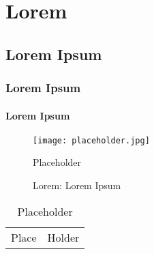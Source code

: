 \documentclass[../thesis.tex]{subfiles}
\begin{document}
\chapter{Lorem}\label{chap:lorem}


\lipsum[1-1] \citep{suprapti2017}

\section{Lorem Ipsum}

\lipsum[2-2]

\subsection{Lorem Ipsum}

\lipsum[3-3]

\subsubsection{Lorem Ipsum}

\lipsum[4-4]

\begin{figure}[htpb]
    \centering
    \texttt{[image: placeholder.jpg]}
    \caption{Placeholder}
    \caption*{Lorem: Lorem Ipsum}
    \label{fig:place}
\end{figure}

\begin{table}[htpb]
    \centering
    \caption{Placeholder}
    \label{tab:holder}
    \begin{tabular}{ll}
    Place & Holder \\
    \end{tabular}
\end{table}

\end{document}
